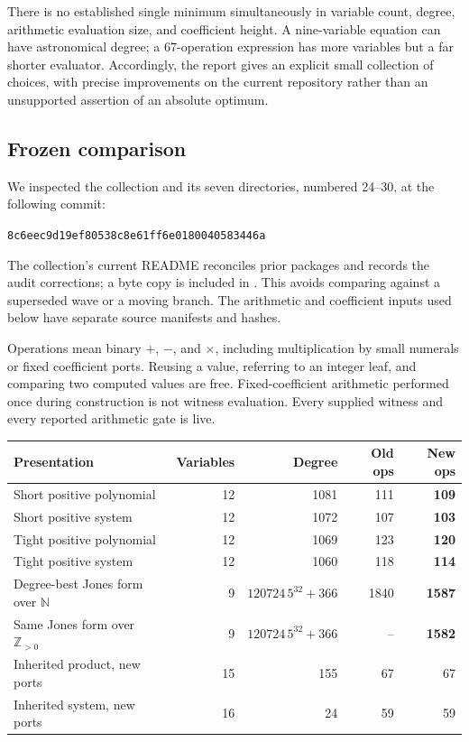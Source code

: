 \documentclass[11pt]{article}
\newcommand{\N}{\mathbb N}
\newcommand{\Pos}{\mathbb Z_{>0}}
\newcommand{\pin}{\texttt{8c6eec9d19ef80538c8e61ff6e0180040583446a}}
\begin{document}
There is no established single minimum simultaneously in variable count,
degree, arithmetic evaluation size, and coefficient height. A nine-variable
equation can have astronomical degree; a 67-operation expression has more
variables but a far shorter evaluator. Accordingly, the report gives an
explicit small collection of choices, with precise improvements on the current
repository rather than an unsupported assertion of an absolute optimum.

\subsection{Frozen comparison}

We inspected the collection and its seven directories, numbered 24--30, at
the following commit:
\begin{center}\small\pin\end{center}
The collection's current README reconciles prior packages and records
the audit corrections; a byte copy is included in
. This avoids comparing against a superseded
wave or a moving branch. The arithmetic and coefficient inputs used below
have separate source manifests and hashes.

Operations mean binary $+$, $-$, and $\times$, including multiplication by
small numerals or fixed coefficient ports. Reusing a value, referring to an
integer leaf, and comparing two computed values are free. Fixed-coefficient
arithmetic performed once during construction is not witness evaluation.
Every supplied witness and every reported arithmetic gate is live.

\begin{center}
\small
\begin{tabular}{@{}p{}rrrr@{}}
\toprule
Presentation & Variables & Degree & Old ops & New ops\\
\midrule
Short positive polynomial & 12 & 1081 & 111 & \textbf{109}\\
Short positive system & 12 & 1072 & 107 & \textbf{103}\\
Tight positive polynomial & 12 & 1069 & 123 & \textbf{120}\\
Tight positive system & 12 & 1060 & 118 & \textbf{114}\\
Degree-best Jones form over $\N$ & 9 & $120724\,5^{32}+366$ & 1840 & \textbf{1587}\\
Same Jones form over $\Pos$ & 9 & $120724\,5^{32}+366$ & -- & \textbf{1582}\\
Inherited product, new ports & 15 & 155 & 67 & 67\\
Inherited system, new ports & 16 & 24 & 59 & 59\\
\bottomrule
\end{tabular}
\end{center}
\end{document}
